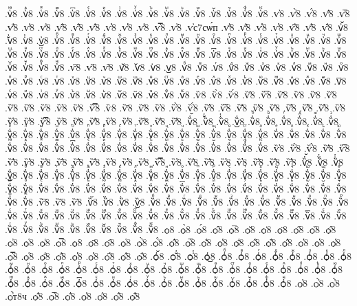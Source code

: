 {.ѵ҅ⷼ8
.ѵ҅ⷽ8
.ѵ҅ⷾ8
.ѵ҅ⷿ8
.ѵ҅꙯8
.ѵ҅ꙴ8
.ѵ҅ꙵ8
.ѵ҅ꙶ8
.ѵ҅ꙷ8
.ѵ҅ꙸ8
.ѵ҅ꙹ8
.ѵ҅ꙺ8
.ѵ҅ꙻ8
.ѵ҅꙼8
.ѵ҅꙽8
.ѵ҅ꚞ8
.ѵ҅ꚟ8
.ѵ҆8
.ѵ҆̀8
.ѵ҆́8
.ѵ҆̂8
.ѵ҆̅8
.ѵ҆̆8
.ѵ҆̇8
.ѵ҆̈8
.ѵ҆̋8
.ѵ҆̏8
.ѵ҆̑8
.ѵ҆̓8
.ѵ҆̔8
.ѵ҆̾8
.ѵ҆̿8
.ѵ҆͘8
.ѵ҆с7сѡ́п
.ѵ҆҃8
.ѵ҆҄8
.ѵ҆҅8
.ѵ҆҆8
.ѵ҆҇8
.ѵ҆᷀8
.ѵ҆᷁8
.ѵ҆᷶8
.ѵ᷷҆8
.ѵ᷸҆8
.ѵ᷹҆8
.ѵ҆ⷠ8
.ѵ҆ⷡ8
.ѵ҆ⷢ8
.ѵ҆ⷣ8
.ѵ҆ⷤ8
.ѵ҆ⷥ8
.ѵ҆ⷦ8
.ѵ҆ⷧ8
.ѵ҆ⷨ8
.ѵ҆ⷩ8
.ѵ҆ⷪ8
.ѵ҆ⷫ8
.ѵ҆ⷬ8
.ѵ҆ⷭ8
.ѵ҆ⷮ8
.ѵ҆ⷯ8
.ѵ҆ⷰ8
.ѵ҆ⷱ8
.ѵ҆ⷲ8
.ѵ҆ⷳ8
.ѵ҆ⷴ8
.ѵ҆ⷵ8
.ѵ҆ⷶ8
.ѵ҆ⷷ8
.ѵ҆ⷸ8
.ѵ҆ⷹ8
.ѵ҆ⷺ8
.ѵ҆ⷻ8
.ѵ҆ⷼ8
.ѵ҆ⷽ8
.ѵ҆ⷾ8
.ѵ҆ⷿ8
.ѵ҆꙯8
.ѵ҆ꙴ8
.ѵ҆ꙵ8
.ѵ҆ꙶ8
.ѵ҆ꙷ8
.ѵ҆ꙸ8
.ѵ҆ꙹ8
.ѵ҆ꙺ8
.ѵ҆ꙻ8
.ѵ҆꙼8
.ѵ҆꙽8
.ѵ҆ꚞ8
.ѵ҆ꚟ8
.ѵ҇8
.ѵ᷀8
.ѵ᷁8
.ѵ᷶8
.ѵ᷷8
.ѵ᷸8
.ѵ᷹8
.ѵⷠ8
.ѵⷡ8
.ѵⷢ8
.ѵⷣ8
.ѵⷤ8
.ѵⷥ8
.ѵⷦ8
.ѵⷧ8
.ѵⷨ8
.ѵⷩ8
.ѵⷪ8
.ѵⷫ8
.ѵⷬ8
.ѵⷭ8
.ѵⷮ8
.ѵⷯ8
.ѵⷰ8
.ѵⷱ8
.ѵⷲ8
.ѵⷳ8
.ѵⷴ8
.ѵⷵ8
.ѵⷶ8
.ѵⷷ8
.ѵⷸ8
.ѵⷹ8
.ѵⷺ8
.ѵⷻ8
.ѵⷼ8
.ѵⷽ8
.ѵⷾ8
.ѵⷿ8
.ѵ꙯8
.ѵꙴ8
.ѵꙵ8
.ѵꙶ8
.ѵꙷ8
.ѵꙸ8
.ѵꙹ8
.ѵꙺ8
.ѵꙻ8
.ѵ꙼8
.ѵ꙽8
.ѵꚞ8
.ѵꚟ8
.ѷ8
.ѷ̀8
.ѷ́8
.ѷ̂8
.ѷ̅8
.ѷ̆8
.ѷ̇8
.ѷ̈8
.ѷ̋8
.ѷ̏8
.ѷ̑8
.ѷ̓8
.ѷ̔8
.ѷ̾8
.ѷ̿8
.ѷ͘8
.ѷ҃8
.ѷ҄8
.ѷ҅8
.ѷ҅̀8
.ѷ҅́8
.ѷ҅̂8
.ѷ҅̅8
.ѷ҅̆8
.ѷ҅̇8
.ѷ҅̈8
.ѷ҅̋8
.ѷ҅̏8
.ѷ҅̑8
.ѷ҅̓8
.ѷ҅̔8
.ѷ҅̾8
.ѷ҅̿8
.ѷ҅͘8
.ѷ҅҃8
.ѷ҅҄8
.ѷ҅҅8
.ѷ҅҆8
.ѷ҅҇8
.ѷ҅᷀8
.ѷ҅᷁8
.ѷ҅᷶8
.ѷ᷷҅8
.ѷ᷸҅8
.ѷ᷹҅8
.ѷ҅ⷠ8
.ѷ҅ⷡ8
.ѷ҅ⷢ8
.ѷ҅ⷣ8
.ѷ҅ⷤ8
.ѷ҅ⷥ8
.ѷ҅ⷦ8
.ѷ҅ⷧ8
.ѷ҅ⷨ8
.ѷ҅ⷩ8
.ѷ҅ⷪ8
.ѷ҅ⷫ8
.ѷ҅ⷬ8
.ѷ҅ⷭ8
.ѷ҅ⷮ8
.ѷ҅ⷯ8
.ѷ҅ⷰ8
.ѷ҅ⷱ8
.ѷ҅ⷲ8
.ѷ҅ⷳ8
.ѷ҅ⷴ8
.ѷ҅ⷵ8
.ѷ҅ⷶ8
.ѷ҅ⷷ8
.ѷ҅ⷸ8
.ѷ҅ⷹ8
.ѷ҅ⷺ8
.ѷ҅ⷻ8
.ѷ҅ⷼ8
.ѷ҅ⷽ8
.ѷ҅ⷾ8
.ѷ҅ⷿ8
.ѷ҅꙯8
.ѷ҅ꙴ8
.ѷ҅ꙵ8
.ѷ҅ꙶ8
.ѷ҅ꙷ8
.ѷ҅ꙸ8
.ѷ҅ꙹ8
.ѷ҅ꙺ8
.ѷ҅ꙻ8
.ѷ҅꙼8
.ѷ҅꙽8
.ѷ҅ꚞ8
.ѷ҅ꚟ8
.ѷ҆8
.ѷ҆̀8
.ѷ҆́8
.ѷ҆̂8
.ѷ҆̅8
.ѷ҆̆8
.ѷ҆̇8
.ѷ҆̈8
.ѷ҆̋8
.ѷ҆̏8
.ѷ҆̑8
.ѷ҆̓8
.ѷ҆̔8
.ѷ҆̾8
.ѷ҆̿8
.ѷ҆͘8
.ѷ҆҃8
.ѷ҆҄8
.ѷ҆҅8
.ѷ҆҆8
.ѷ҆҇8
.ѷ҆᷀8
.ѷ҆᷁8
.ѷ҆᷶8
.ѷ᷷҆8
.ѷ᷸҆8
.ѷ᷹҆8
.ѷ҆ⷠ8
.ѷ҆ⷡ8
.ѷ҆ⷢ8
.ѷ҆ⷣ8
.ѷ҆ⷤ8
.ѷ҆ⷥ8
.ѷ҆ⷦ8
.ѷ҆ⷧ8
.ѷ҆ⷨ8
.ѷ҆ⷩ8
.ѷ҆ⷪ8
.ѷ҆ⷫ8
.ѷ҆ⷬ8
.ѷ҆ⷭ8
.ѷ҆ⷮ8
.ѷ҆ⷯ8
.ѷ҆ⷰ8
.ѷ҆ⷱ8
.ѷ҆ⷲ8
.ѷ҆ⷳ8
.ѷ҆ⷴ8
.ѷ҆ⷵ8
.ѷ҆ⷶ8
.ѷ҆ⷷ8
.ѷ҆ⷸ8
.ѷ҆ⷹ8
.ѷ҆ⷺ8
.ѷ҆ⷻ8
.ѷ҆ⷼ8
.ѷ҆ⷽ8
.ѷ҆ⷾ8
.ѷ҆ⷿ8
.ѷ҆꙯8
.ѷ҆ꙴ8
.ѷ҆ꙵ8
.ѷ҆ꙶ8
.ѷ҆ꙷ8
.ѷ҆ꙸ8
.ѷ҆ꙹ8
.ѷ҆ꙺ8
.ѷ҆ꙻ8
.ѷ҆꙼8
.ѷ҆꙽8
.ѷ҆ꚞ8
.ѷ҆ꚟ8
.ѷ҇8
.ѷ᷀8
.ѷ᷁8
.ѷ᷶8
.ѷ᷷8
.ѷ᷸8
.ѷ᷹8
.ѷⷠ8
.ѷⷡ8
.ѷⷢ8
.ѷⷣ8
.ѷⷤ8
.ѷⷥ8
.ѷⷦ8
.ѷⷧ8
.ѷⷨ8
.ѷⷩ8
.ѷⷪ8
.ѷⷫ8
.ѷⷬ8
.ѷⷭ8
.ѷⷮ8
.ѷⷯ8
.ѷⷰ8
.ѷⷱ8
.ѷⷲ8
.ѷⷳ8
.ѷⷴ8
.ѷⷵ8
.ѷⷶ8
.ѷⷷ8
.ѷⷸ8
.ѷⷹ8
.ѷⷺ8
.ѷⷻ8
.ѷⷼ8
.ѷⷽ8
.ѷⷾ8
.ѷⷿ8
.ѷ꙯8
.ѷꙴ8
.ѷꙵ8
.ѷꙶ8
.ѷꙷ8
.ѷꙸ8
.ѷꙹ8
.ѷꙺ8
.ѷꙻ8
.ѷ꙼8
.ѷ꙽8
.ѷꚞ8
.ѷꚟ8
.ѻ8
.ѻ̀8
.ѻ́8
.ѻ̂8
.ѻ̅8
.ѻ̆8
.ѻ̇8
.ѻ̈8
.ѻ̋8
.ѻ̏8
.ѻ̑8
.ѻ̓8
.ѻ̔8
.ѻ̾8
.ѻ̿8
.ѻ͘8
.ѻ҃8
.ѻ҄8
.ѻ҅8
.ѻ҅̀8
.ѻ҅́8
.ѻ҅̂8
.ѻ҅̅8
.ѻ҅̆8
.ѻ҅̇8
.ѻ҅̈8
.ѻ҅̋8
.ѻ҅̏8
.ѻ҅̑8
.ѻ҅̓8
.ѻ҅̔8
.ѻ҅̾8
.ѻ҅̿8
.ѻ҅͘8
.ѻ҅҃8
.ѻ҅҄8
.ѻ҅҅8
.ѻ҅҆8
.ѻ҅҇8
.ѻ҅᷀8
.ѻ҅᷁8
.ѻ҅᷶8
.ѻ᷷҅8
.ѻ᷸҅8
.ѻ᷹҅8
.ѻ҅ⷠ8
.ѻ҅ⷡ8
.ѻ҅ⷢ8
.ѻ҅ⷣ8
.ѻ҅ⷤ8
.ѻ҅ⷥ8
.ѻ҅ⷦ8
.ѻ҅ⷧ8
.ѻ҅ⷨ8
.ѻ҅ⷩ8
.ѻ҅ⷪ8
.ѻ҅ⷫ8
.ѻ҅ⷬ8
.ѻ҅ⷭ8
.ѻ҅ⷮ8
.ѻ҅ⷯ8
.ѻ҅ⷰ8
.ѻ҅ⷱ8
.ѻ҅ⷲ8
.ѻ҅ⷳ8
.ѻ҅ⷴ8
.ѻ҅ⷵ8
.ѻ҅ⷶ8
.ѻ҅ⷷ8
.ѻ҅ⷸ8
.ѻ҅ⷹ8
.ѻ҅ⷺ8
.ѻ҅ⷻ8
.ѻ҅ⷼ8
.ѻ҅ⷽ8
.ѻ҅ⷾ8
.ѻ҅ⷿ8
.ѻ҅꙯8
.ѻ҅ꙴ8
.ѻ҅ꙵ8
.ѻ҅ꙶ8
.ѻ҅ꙷ8
.ѻ҅ꙸ8
.ѻ҅ꙹ8
.ѻ҅ꙺ8
.ѻ҅ꙻ8
.ѻ҅꙼8
.ѻ҅꙽8
.ѻ҅ꚞ8
.ѻ҅ꚟ8
.ѻ҆8
.ѻ҆̀8
.ѻ҆́8
.ѻ҆́т8ч
.ѻ҆̂8
.ѻ҆̅8
.ѻ҆̆8
.ѻ҆̇8
.ѻ҆̈8
.ѻ҆̋8
.ѻ҆̏8
}
